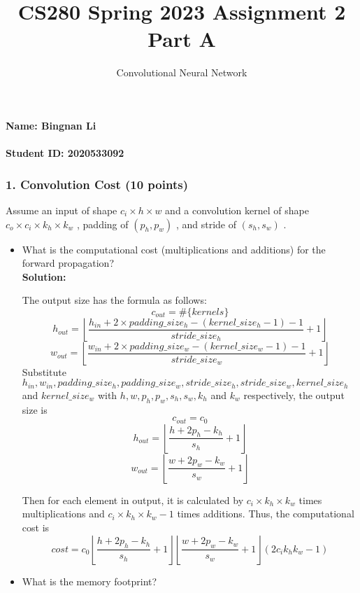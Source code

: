 \documentclass[12pt]{article}%
\begin{document}
    \title{CS280 Spring 2023 Assignment 2 \\ Part A}
    \author{Convolutional Neural Network}
    \maketitle

    \paragraph{Name: Bingnan Li}

    \paragraph{Student ID: 2020533092}

    \newpage


    \subsubsection*{1. Convolution Cost (10 points)}
    Assume an input of shape  $c_i\times h\times w$  and a convolution kernel of shape  $c_o\times c_i\times k_h\times k_w$ , padding of  $(p_h,p_w)$ , and stride of  $(s_h,s_w)$ .
    \begin{itemize}
        \item What is the computational cost (multiplications and additions) for the forward propagation?\\
        {\bf Solution:}
        \par The output size has the formula as follows:
        \[c_{out}=\#\{kernels\}\]
        \[h_{out}=\left\lfloor\frac{h_{in}+2\times padding\_size_h-(kernel\_size_h-1)-1}{stride\_size_h}+1\right\rfloor \]
        \[w_{out}=\left\lfloor\frac{w_{in}+2\times padding\_size_w-(kernel\_size_w-1)-1}{stride\_size_w}+1\right\rfloor \]
        Substitute $h_{in}, w_{in}, padding\_size_h, padding\_size_w, stride\_size_h, stride\_size_w, kernel\_size_h$ and $kernel\_size_w$
        with $h, w, p_h,p_w,s_h,s_w,k_h$ and $k_w$ respectively, the output size is
        \[c_{out}=c_0\]
        \[h_{out}=\left\lfloor\frac{h+2p_h-k_h}{s_h}+1\right\rfloor \]
        \[w_{out}=\left\lfloor\frac{w+2p_w-k_w}{s_w}+1\right\rfloor \]

        Then for each element in output, it is calculated by $c_i\times k_h\times k_w$ times multiplications and $c_i\times k_h\times k_w - 1$ times additions.
        Thus, the computational cost is
        \[cost = c_0\left\lfloor\frac{h+2p_h-k_h}{s_h}+1\right\rfloor\left\lfloor\frac{w+2p_w-k_w}{s_w}+1\right\rfloor\left(2c_i k_h k_w-1\right)\]
        \item What is the memory footprint?
    \end{itemize}
\end{document}
